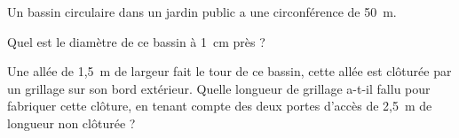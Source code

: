 Un bassin circulaire dans un jardin public a une circonférence de 50~m.
\begin{myenumerate}
\item Quel est le diamètre de ce bassin à 1~cm près ?
\item Une allée de 1,5~m de largeur fait le tour de ce bassin, cette allée est clôturée par un grillage sur son bord extérieur. Quelle longueur de grillage a-t-il fallu pour fabriquer cette clôture,  en tenant compte des deux portes d'accès de 2,5~m de longueur non clôturée ?
\end{myenumerate}